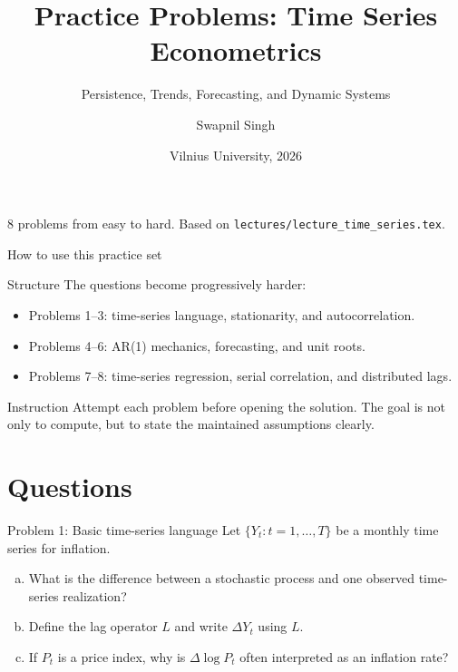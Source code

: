 \documentclass[10pt]{beamer}
\title{Practice Problems: Time Series Econometrics}
\subtitle{Persistence, Trends, Forecasting, and Dynamic Systems}
\author{Swapnil Singh}
\institute{Lietuvos Bankas \and Kaunas University of Technology}
\date{Vilnius University, 2026}
\begin{document}
\begin{frame}[plain]
  \titlepage
  \vfill
  {\scriptsize\color{gray} 8 problems from easy to hard. Based on \texttt{lectures/lecture\_time\_series.tex}.}
\end{frame}

\begin{frame}{How to use this practice set}
\small
\begin{block}{Structure}
The questions become progressively harder:
\begin{itemize}
  \item Problems 1--3: time-series language, stationarity, and autocorrelation.
  \item Problems 4--6: AR(1) mechanics, forecasting, and unit roots.
  \item Problems 7--8: time-series regression, serial correlation, and distributed lags.
\end{itemize}
\end{block}

\begin{alertblock}{Instruction}
Attempt each problem before opening the solution. The goal is not only to compute, but to state the maintained assumptions clearly.
\end{alertblock}
\end{frame}

\section{Questions}

\begin{frame}{Problem 1: Basic time-series language}
\label{q1}
\small
Let $\{Y_t:t=1,\ldots,T\}$ be a monthly time series for inflation.

\begin{enumerate}[(a)]
  \item What is the difference between a stochastic process and one observed time-series realization?
  \item Define the lag operator $L$ and write $\Delta Y_t$ using $L$.
  \item If $P_t$ is a price index, why is $\Delta \log P_t$ often interpreted as an inflation rate?
\end{enumerate}

\vfill
\hfill\hyperlink{s1}{}
\end{frame}
\end{document}
